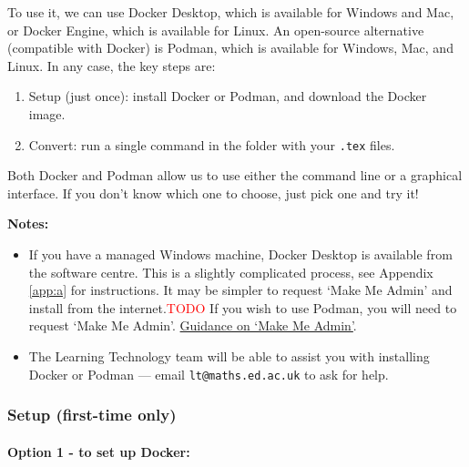 To use it, we can use Docker Desktop, which is available for Windows and Mac, or Docker Engine, which is available for Linux. An open-source alternative (compatible with Docker) is Podman, which is available for Windows, Mac, and Linux. In any case, the key steps are:

\begin{enumerate}
    \item Setup (just once): install Docker or Podman, and download the Docker image.
    \item Convert: run a single command in the folder with your \verb|.tex| files.
\end{enumerate}

Both Docker and Podman allow us to use either the command line or a graphical interface. If you don't know which one to choose, just pick one and try it!

\noindent \textbf{Notes: }
\begin{itemize}
    \item If you have a managed Windows machine, Docker Desktop is available from the software centre. This is a slightly complicated process, 
    see Appendix \ref{app:a} for instructions. It may be simpler to request `Make Me Admin' and install from the internet.\textcolor{red}{TODO}
    If you wish to use Podman, you will need to request `Make Me Admin'.
    \href{https://www.ed.ac.uk/information-services/computing/desktop-personal/supported/windows-10/makemeadmin}{Guidance on `Make Me Admin'}.
    \item The Learning Technology team will be able to assist you with installing Docker or Podman --- email \verb|lt@maths.ed.ac.uk| to ask for help.
\end{itemize}

\subsubsection{Setup (first-time only)}
\label{sssec:setup}

\paragraph{Option 1 - to set up Docker:}

